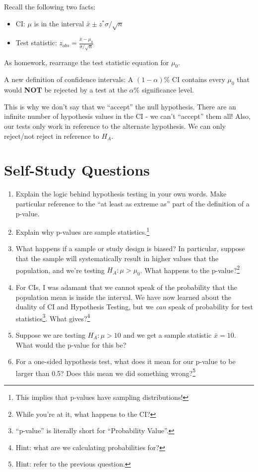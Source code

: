 \documentclass[
  letterpaper,
  DIV=11,
  numbers=noendperiod,
  oneside]{scrreprt}
\providecommand{\tightlist}{%
  \setlength{\itemsep}{0pt}\setlength{\parskip}{0pt}}\usepackage{longtable,booktabs,array}
\begin{document}
Recall the following two facts:

\begin{itemize}
\tightlist
\item
  CI: \(\mu\) is in the interval \(\bar x \pm z^*\sigma/\sqrt{n}\)
\item
  Test statistic: \(z_{obs} = \frac{\bar x - \mu_0}{\sigma/\sqrt{n}}\)
\end{itemize}

As homework, rearrange the test statistic equation for \(\mu_0\).

A new definition of confidence intervals: A \((1-\alpha)\)\% CI contains
every \(\mu_0\) that would \textbf{NOT} be rejected by a test at the
\(\alpha\)\% significance level.

This is why we don't say that we ``accept'' the null hypothesis. There
are an infinite number of hypothesis values in the CI - we can't
``accept'' them all! Also, our tests only work in reference to the
alternate hypothesis. We can only reject/not reject in reference to
\(H_A\).

\hypertarget{self-study-questions-3}{%
\section{Self-Study Questions}\label{self-study-questions-3}}

\begin{enumerate}
\def\labelenumi{\arabic{enumi}.}
\tightlist
\item
  Explain the logic behind hypothesis testing in your own words. Make
  particular reference to the ``at least as extreme as'' part of the
  definition of a p-value.
\item
  Explain why p-values are sample statistics.\footnote{This implies that
    p-values have sampling distributions!}
\item
  What happens if a sample or study design is biased? In particular,
  suppose that the sample will systematically result in higher values
  that the population, and we're testing \(H_A:\mu > \mu_0\). What
  happens to the p-value?\footnote{While you're at it, what happens to
    the CI?}
\item
  For CIs, I was adamant that we cannot speak of the probability that
  the population mean is inside the interval. We have now learned about
  the duality of CI and Hypothesis Testing, but we \emph{can} speak of
  probability for test statistics\footnote{``p-value'' is literally
    short for ``Probability Value''.}. What gives?\footnote{Hint: what
    are we calculating probabilities for?}
\item
  Suppose we are testing \(H_A:\mu > 10\) and we get a sample statistic
  \(\bar x = 10\). What would the p-value for this be?
\item
  For a one-sided hypothesis test, what does it mean for our p-value to
  be larger than 0.5? Does this mean we did something wrong?\footnote{Hint:
    refer to the previous question.}
\end{enumerate}
\end{document}
